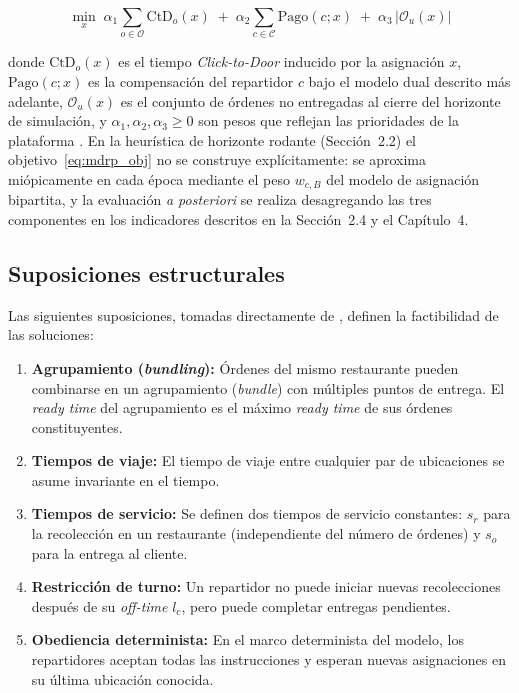 \documentclass[12pt,letterpaper,oneside]{book}
\begin{document}
	\begin{equation}
	    \min_{x} \;
	    \alpha_1 \sum_{o \in \mathcal{O}} \text{CtD}_o(x)
	    \;+\; \alpha_2 \sum_{c \in \mathcal{C}} \text{Pago}(c; x)
	    \;+\; \alpha_3 \, |\mathcal{O}_{u}(x)|
	    \label{eq:mdrp_obj}
	\end{equation}

	\noindent donde $\text{CtD}_o(x)$ es el tiempo \textit{Click-to-Door} inducido
	por la asignación $x$, $\text{Pago}(c; x)$ es la compensación del
	repartidor $c$ bajo el modelo dual descrito más adelante,
	$\mathcal{O}_u(x)$ es el conjunto de órdenes no entregadas al cierre
	del horizonte de simulación, y $\alpha_1, \alpha_2, \alpha_3 \geq 0$
	son pesos que reflejan las prioridades de la plataforma
	\citep{Reyes2018, Ulmer2021RMDP}.  En la heurística de horizonte
	rodante (Sección~2.2) el objetivo~\eqref{eq:mdrp_obj} no se construye
	explícitamente: se aproxima miópicamente en cada época mediante el peso
	$w_{c,B}$ del modelo de asignación bipartita, y la evaluación
	\emph{a posteriori} se realiza desagregando las tres componentes en los
	indicadores descritos en la Sección~2.4 y el Capítulo~4.

	\subsection{Suposiciones estructurales}

	Las siguientes suposiciones, tomadas directamente de \citet{Reyes2018},
	definen la factibilidad de las soluciones:

	\begin{enumerate}
		\item \textbf{Agrupamiento (\textit{bundling}):} Órdenes del mismo
		      restaurante pueden combinarse en un agrupamiento (\textit{bundle})
		      con múltiples puntos de entrega.  El \textit{ready time} del
		      agrupamiento es el máximo \textit{ready time} de sus órdenes
		      constituyentes.

		\item \textbf{Tiempos de viaje:} El tiempo de viaje entre cualquier par
		      de ubicaciones se asume invariante en el tiempo.

		\item \textbf{Tiempos de servicio:} Se definen dos tiempos de servicio
		      constantes: $s_r$ para la recolección en un restaurante (independiente
		      del número de órdenes) y $s_o$ para la entrega al cliente.

		\item \textbf{Restricción de turno:} Un repartidor no puede iniciar nuevas
		      recolecciones después de su \textit{off-time} $l_c$, pero puede
		      completar entregas pendientes.

		\item \textbf{Obediencia determinista:} En el marco determinista del
		      modelo, los repartidores aceptan todas las instrucciones y esperan nuevas
		      asignaciones en su última ubicación conocida.
	\end{enumerate}
\end{document}

